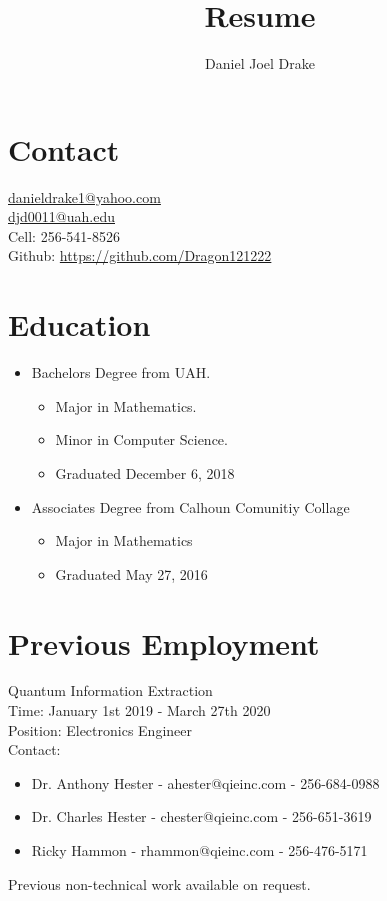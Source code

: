 \documentclass[10pt]{extarticle}
\title{
	Resume \\
}
\author{Daniel Joel Drake}
\theoremstyle{plain}
\theoremstyle{Definition}
\theoremstyle{Definition}
\theoremstyle{plain}
\begin{document}
	\twocolumn
	\maketitle		
	\noindent
	\section{Contact}
	\href{mailto:danieldrake1@yahoo.com}{danieldrake1@yahoo.com}  \\
	\href{mailto:djd0011@uah.edu}{djd0011@uah.edu}  \\
	Cell: 256-541-8526  \\
	Github: \href{https://github.com/Dragon121222}{https://github.com/Dragon121222} 
	\section{Education}
		\begin{itemize}
			\item Bachelors Degree from UAH.
			\begin{itemize}
				\item Major in Mathematics.
				\item Minor in Computer Science.
				\item Graduated December 6, 2018
		\end{itemize}
			\item Associates Degree from Calhoun Comunitiy Collage
			\begin{itemize}
				\item Major in Mathematics
				\item Graduated May 27, 2016
			\end{itemize}
		\end{itemize}
	\section{Previous Employment}
		Quantum Information Extraction \\
		Time: January 1st 2019 - March 27th 2020 \\ 
		Position: Electronics Engineer \\	 
		Contact: 
		\begin{itemize}
			\item Dr. Anthony Hester - ahester@qieinc.com - 256-684-0988
			\item Dr. Charles Hester - chester@qieinc.com - 256-651-3619
			\item Ricky Hammon - rhammon@qieinc.com - 256-476-5171
		\end{itemize}	
	Previous non-technical work available on request. 
\end{document}
